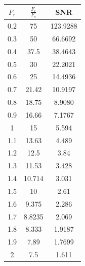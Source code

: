 \documentclass[12pt, a4paper] {ncc}
\begin{document}
        \begin{table}[H]
            \centering
            \begin{tabular} { |c|c|c| }
                \hline
                \textbf{$F_r$} & \textbf{$ \frac {F_r} {F_s} $} & \textbf{SNR}  \\ \hline
                    0.2 & 75     &   123.9288 \\ \hline
                    0.3 & 50     &   66.6692  \\ \hline
                    0.4 & 37.5   &   38.4643  \\ \hline
                    0.5 & 30     &   22.2021  \\ \hline
                    0.6 & 25     &   14.4936  \\ \hline
                    0.7 & 21.42  &   10.9197  \\ \hline
                    0.8 & 18.75  &   8.9080   \\ \hline
                    0.9 & 16.66  &   7.1767   \\ \hline
                    1   & 15     &   5.594    \\ \hline
                    1.1 & 13.63  &   4.489    \\ \hline
                    1.2 & 12.5   &   3.84     \\ \hline
                    1.3 & 11.53  &   3.428    \\ \hline
                    1.4 & 10.714 &   3.031    \\ \hline
                    1.5 & 10     &   2.61     \\ \hline
                    1.6 & 9.375  &   2.286    \\ \hline
                    1.7 & 8.8235 &   2.069    \\ \hline
                    1.8 & 8.333  &   1.9187   \\ \hline
                    1.9 & 7.89   &   1.7699   \\ \hline
                    2   & 7.5    &   1.611    \\ \hline
            \end{tabular}
        \end{table}
\end{document}
